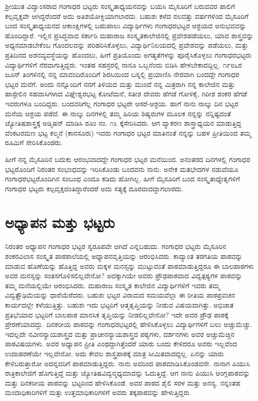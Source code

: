 ಶ್ರೀಯುತ ವಿದ್ವಾಂಸರಾದ ಗಂಗಾಧರ ಭಟ್ಟರು ಸಂಸ್ಕೃತಾಧ್ಯಯನವನ್ನು ಬಯಸಿ ಮೈಸೂರಿಗೆ ಬರುವವರ ಪಾಲಿಗೆ ಕಲ್ಪವೃಕ್ಷವೇ ಆಗಿದ್ದರೆಂದರೆ ಅದು ಅತಿಶಯೋಕ್ತಿಯಾಗಲಾರದು. ಬಹುಶಃ ಕಳೆದ ನಲವತ್ತು ವರ್ಷಗಳಿಂದ ಮೈಸೂರಿಗೆ ಬಂದ ಸಂಸ್ಕೃತಾಧ್ಯಯನದ ಆಕಾಂಕ್ಷಿಗಳಲ್ಲಿ ಬಹುಪಾಲು ವಿದ್ಯಾರ್ಥಿಗಳು ಗಂಗಾಧರಭಟ್ಟರ ಆಶ್ರಯದ ಅನುಭವವನ್ನು ಹೊಂದಿದ್ದಾರೆ. ಇಲ್ಲಿನ ಪ್ರಸಿದ್ಧವಾದ ಸರ್ಕಾರಿ ಮಹಾರಾಜ ಸಂಸ್ಕೃತಕಾಲೇಜಿನಲ್ಲಿ ಪ್ರವೇಶಪಡೆಯಲು, ಯಾವ ಶಾಸ್ತ್ರವನ್ನು ಅಧ್ಯನಮಾಡಬೇಕೆಂಬ ಗೊಂದಲವನ್ನು ಪರಿಹರಿಸಿಕೊಳ್ಳಲು, ವಿದ್ಯಾರ್ಥಿನಿಲಯದಲ್ಲಿ ಪ್ರವೇಶವನ್ನು ಪಡೆಯಲು, ಮತ್ತು ಪ್ರತಿದಿನದ ಅಶನವ್ಯವಸ್ಥೆಯನ್ನು ಹೊಂದಲು, ಹೀಗೆ ಪ್ರತಿಯೊಂದು ಅಗತ್ಯತೆಗಳನ್ನು ಪೂರೈಸಿಕೊಳ್ಳಲು ಗಂಗಾಧರಭಟ್ಟರು ವಿದ್ಯಾರ್ಥಿಗಳಿಗೆ ನೆರವಾಗುತ್ತಿದ್ದರು. ಇಂತಹ ಸಹಸ್ರರಲ್ಲಿ ನಾನೂ ಒಬ್ಬನೆಂದು ಬಿಡಿಸಿ ಹೇಳಬೇಕಾದದ್ದಿಲ್ಲ. ೧೯೮೬ರ ಜೂನ್ ತಿಂಗಳಿನಲ್ಲಿ ನನ್ನ ಮಾವಂದಿರೊಂದಿಗೆ ಶಿರಸಿಯಿಂದ ಬಸ್ನಲ್ಲಿ ಪ್ರಯಾಣಿಸಿ ನೇರವಾಗಿ ಬಂದದ್ದೇ ಗಂಗಾಧರ ಭಟ್ಟರ ಮನೆಗೆ. ಅಂದು ನನ್ನೊಂದಿಗೆ ನನಗೆ ತಿಳಿಯದ ಮತ್ತು ಮುಂದೆ ನನ್ನ ಮಿತ್ರರಾಗಿ ನನ್ನ ಕಾಲೇಜಿನ ಮತ್ತು ಹಾಸ್ಟೇಲಿನ ಸಹವಾಸಿಗಳಾದ ವಿಘ್ನೇಶ್ವರಭಟ್ಟ ಕೋಟೆಮನೆ, ಸತೀಶ ದೇವರು ಹೆಗಡೆ ಗೋಳಿಕೈ, ಗಿರೀಶ ಶಂಕರ ಹೆಗಡೆ ಇವರುಗಳೂ ಬಂದಿದ್ದರು. ಬಂದವರಿಗೆಲ್ಲ ಗಂಗಾಧರ ಭಟ್ಟರೇ ಆಸರೆ-ಆಶ್ರಯ. ಹಾಗೆ ನಾನು ನಾಲ್ಕು ದಿನ ಭಟ್ಟರ ಮನೆಯ ಆಶ್ರಯ ಪಡೆದೆ. ಈ ನಾಲ್ಕು ದಿನಗಳಲ್ಲಿ ತಮ್ಮ ಹಿರಿಯ ಶಿಷ್ಯರುಗಳ ಮೂಲಕ ನನ್ನನ್ನು ನನ್ನಿಷ್ಟದಂತೆ ಜ್ಯೋತಿಷಶಾಸ್ತ್ರಕ್ಕೆ ಅಡ್ಮಿಷನ್ ಮಾಡಿಸಿ ರೂಂ ನಂ. ೧೩ ಕ್ಕೆಸೇರಿಸಿದರು. ಆಗ ವ್ಯಾಕರಣ ಶಾಸ್ತ್ರಾಧ್ಯಯನ ಮಾಡುತ್ತಿದ್ದ ವೆಂಕಟರಮಣ ಭಟ್ಟ ಕಲ್ಮನೆ (ಕಾನಸೂರು) ಇವರು ಗಂಗಾಧರ ಭಟ್ಟರ ಮಾತಿನಂತೆ ನನ್ನನ್ನು ಬಹಳ ಪ್ರೀತಿಯಿಂದ ತಮ್ಮ ರೂಮಿಗೆ ಸೇರಿಸಿಕೊಂಡರು. 

ಹೀಗೆ ನನ್ನ ಮೈಸೂರಿನ ಬದುಕು ಆರಂಭವಾದದ್ದೇ ಗಂಗಾಧರ ಭಟ್ಟರ ಮನೆಯಿಂದ. ಅನಂತರದ ದಿನಗಳಲ್ಲಿ ಗಂಗಾಧರ ಭಟ್ಟರೊಂದಿಗೆ ನಿರಂತರ ಸಂಭಂಧವನ್ನು ಇರಿಸಿಕೊಂಡು ಬಂದವನು ನಾನು. ಅನೇಕ ಮತಭೇದಗಳ ನಡುವೆಯೂ ಗಂಗಾಧರಭಟ್ಟರೊಂದಿಗಿನ ಸಂಬಂಧ ಎಂದೂ ಕಡಿದು ಹೋಗಿಲ್ಲ. ಹೀಗೆ ಮೈಸೂರಿಗೆ ಬಂದ ಸಂಸ್ಕೃತಾಧ್ಯೇತೃಗಳಿಗೆ ಗಂಗಾಧರ ಭಟ್ಟರು ಕಲ್ಪವೃಕ್ಷದಂತಿದ್ದಾರೆಂದರೆ ಅದು ಸತ್ಯಕ್ಕೆ ದೂರವಾದದ್ದಾಗಲಾರದು.

\section*{ಅಧ್ಯಾಪನ ಮತ್ತು ಭಟ್ಟರು}

ನಿರಂತರ ಅಧ್ಯಾಪನ ಗಂಗಾಧರ ಭಟ್ಟರ ಸ್ವರೂಪವೇ ಆಗಿದೆ ಎನ್ನಬಹುದು. ಗಂಗಾಧರ ಭಟ್ಟರು ಮೈಸೂರಿನ ಶಂಕರವಿಲಾಸ ಸಂಸ್ಕೃತ ಪಾಠಶಾಲೆಯಲ್ಲಿ ಅಧ್ಯಾಪನವೃತ್ತಿಯನ್ನು ಆರಂಭಿಸಿದರು. ಕಾವ್ಯಾಂತ ತರಗತಿಯ ಪಾಠವನ್ನು ಮಾಡುವ ಹೊಣೆಯನ್ನು ಹೊತ್ತಿದ್ದ ಅವರು ಮಕ್ಕಳ ಮನಸ್ಸನ್ನು ಮುಟ್ಟುವಂತೆ ಪಾಠಮಾಡುತ್ತಿದ್ದರೂ ಈ ಬಾಲಪಾಠಗಳು ಅವರ ಮನಸ್ಸನ್ನು ಸಂತಸಗೊಳಿಸಲಿಲ್ಲವೇನೋ? ಅದಕ್ಕಾಗಿಯೇ ಅವರು ಪ್ರೌಢಪಾಠವಾದ ವಿದ್ವತ್ಪಠ್ಯಗಳ ಪಾಠವನ್ನು ತಮ್ಮ ಮನೆಯಲ್ಲಿಯೇ ಆರಂಭಿಸಿದರು. ಮಹಾರಾಜ ಸಂಸ್ಕೃತ ಕಾಲೇಜಿನ ವಿದ್ಯಾರ್ಥಿಗಳಿಗೆ ಇವರು ತಮ್ಮ ವಿದ್ವತ್ಪ್ರೌಢಿಮೆಯನ್ನು ಧಾರೆಯೆರೆದರು. ಬಹುಶಃ ಭಟ್ಟರ ವಿರಾಮದ ಸಮಯವೆಲ್ಲಾ ಈ ರೀತಿಯ ಪಾಠಪ್ರವಚನ ಕಾರ್ಯದಲ್ಲೇ ಕಳೆಯುತ್ತಿತ್ತು. ಬಹುಶಃ ಇದು ಭಟ್ಟರಿಗೆ ಆತ್ಮತೃಪ್ತಿಯನ್ನು ನೀಡುವ ವಿಷಯವಾಗಿತ್ತು. ಅಭಿಜಾತ ಪ್ರತಿಭೆಯಾದ ಭಟ್ಟರಿಗೆ ಬಾಲಪಾಠ ಮಾನಸಿಕ ತೃಪ್ತಿಯನ್ನು ನೀಡಲಿಲ್ಲವೇನೋ? ಇದೇ ಅವರ ಪ್ರೌಢ ಪಾಠಕ್ಕೆ ಪ್ರೇರಣೆಯಾದದ್ದು. ದಿನಕರೀಯ ಪಾಠವನ್ನು ಗಂಗಾಧರಭಟ್ಟರಲ್ಲಿ ಹೇಳಿಸಿಕೊಳ್ಳಲು ವಿದ್ಯಾರ್ಥಿಗಳಿಗೆ ಬಲು ಅಚ್ಚುಮೆಚ್ಚು. ಇದಲ್ಲದೇ ನವೀನನ್ಯಾಯಶಾಸ್ತ್ರದ ಮತ್ತು ಪ್ರಾಚೀನನ್ಯಾಯಶಾಸ್ತ್ರದ ಪಠ್ಯಗಳು, ದರ್ಶನಗಳು ಅವರ ಅಚ್ಚುಮೆಚ್ಚಿನ ಪಾಠವಿಷಯಗಳು. ಅವರ ಅಧ್ಯಾಪನ ಪ್ರೀತಿ ಎಂಥದ್ದಾಗಿತ್ತೆಂದರೆ ಯಾರು ಬಂದು ಕೇಳಿದರೂ ಅವರು ಇಲ್ಲವೆಂದ ಉದಾಹರಣೆಯೇ ಇಲ್ಲವೇನೋ. ಅದು ಕೇವಲ ಶಾಸ್ತ್ರಪಾಠಕ್ಕೆ ಮಾತ್ರ ಸೀಮಿತವಾದದ್ದಲ್ಲ. ಏನನ್ನು ಯಾರು ಕೇಳಿಬರುತ್ತಾರೋ ಅದನ್ನವರಿಗೆ ಪಾಠಮಾಡುತ್ತಿದ್ದರು. ನಾನು ಅವರಿಂದ ಪಾಠಮಾಡಿಸಿಕೊಂಡವನೇ. ನಾನಾಗ ಪಿಯುಸಿ ರಾತ್ರಿಕಾಲೇಜಿಗೆ ಹೊಗುತ್ತಿದ್ದೆ ಮತ್ತು ಜ್ಯೋತಿಷವಿದ್ವನ್ಮಧ್ಯಮಾವನ್ನು ಓದುತ್ತಿದ್ದೆ. ಆಗ ನಾನು ಪಿಯುಸಿ ಆಂಗ್ಲಪಾಠವನ್ನು ಮತ್ತು ದಿನಕರೀಯ ಪಾಠವನ್ನು ಭಟ್ಟರಿಂದ ಹೇಳಿಸಿಕೊಂಡೆ. ಅವರ ಪಾಠದ ಶೈಲಿ ಸರಳ ಮತ್ತು ಅನನ್ಯ. ನನ್ನಂತಹ ಮಂದಾಧಿಕಾರಿಗಳಿಗೆ ಮತ್ತು ಉತ್ತಮಾಧಿಕಾರಿಗಳಿಗೆ ಅವರು ತಕ್ಕಪಾಠವನ್ನು ಹೇಳುತ್ತಿದ್ದರು.

